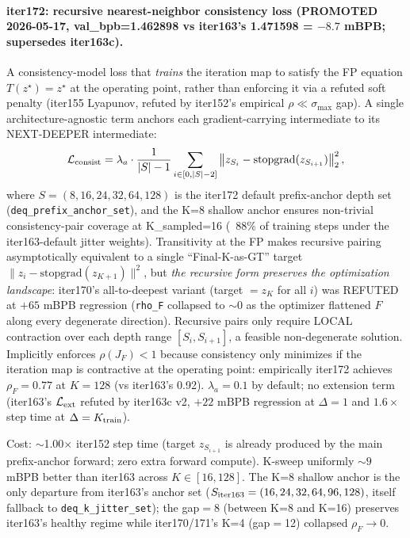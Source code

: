 \documentclass[11pt]{article}
\begin{document}
\paragraph{iter172: recursive nearest-neighbor consistency loss (PROMOTED 2026-05-17, val\_bpb=1.462898 vs iter163's 1.471598 = $-8.7$ mBPB; supersedes iter163c).}
A consistency-model loss \cite{songConsistencyModels2023} that
\emph{trains} the iteration map to satisfy the FP equation
$T(z^\star)=z^\star$ at the operating point, rather than enforcing it via
a refuted soft penalty (iter155 Lyapunov, refuted by iter152's empirical
$\rho \ll \sigma_{\max}$ gap).  A single architecture-agnostic term anchors
each gradient-carrying intermediate to its NEXT-DEEPER intermediate:
\begin{equation}
  \mathcal{L}_{\rm consist}
    = \lambda_a \cdot \frac{1}{|S|-1}
      \sum_{i \in [0, |S|-2]}
       \left\| z_{S_i} - \mathrm{stopgrad}(z_{S_{i+1}}) \right\|_2^2,
\end{equation}
where $S = (8, 16, 24, 32, 64, 128)$ is the iter172 default prefix-anchor
depth set (\texttt{deq\_prefix\_anchor\_set}), and the K=8 shallow anchor
ensures non-trivial consistency-pair coverage at K\_sampled=16 (~88\% of
training steps under the iter163-default jitter weights).  Transitivity at
the FP makes recursive pairing asymptotically equivalent to a single
``Final-K-as-GT'' target $\|z_i - \mathrm{stopgrad}(z_{K+1})\|^2$, but
\emph{the recursive form preserves the optimization landscape}: iter170's
all-to-deepest variant (target $= z_K$ for all $i$) was REFUTED at $+65$
mBPB regression (\texttt{rho\_F} collapsed to $\sim 0$ as the optimizer
flattened $F$ along every degenerate direction).  Recursive pairs only
require LOCAL contraction over each depth range $[S_i, S_{i+1}]$, a
feasible non-degenerate solution.  Implicitly enforces $\rho(J_F) < 1$
because consistency only minimizes if the iteration map is contractive at
the operating point: empirically iter172 achieves $\rho_F = 0.77$ at
$K=128$ (vs iter163's 0.92).
$\lambda_a = 0.1$ by default; no extension term (iter163's
$\mathcal{L}_{\rm ext}$ refuted by iter163c v2, $+22$ mBPB regression at
$\Delta = 1$ and $1.6\times$ step time at $\Delta = K_{\rm train}$).

Cost: $\sim$1.00$\times$ iter152 step time (target $z_{S_{i+1}}$ is
already produced by the main prefix-anchor forward; zero extra forward
compute).  K-sweep uniformly $\sim 9$ mBPB better than iter163 across
$K \in [16, 128]$.  The K=8 shallow anchor is the only departure from
iter163's anchor set ($S_{\rm iter163} = (16, 24, 32, 64, 96, 128)$,
itself fallback to \texttt{deq\_k\_jitter\_set}); the gap$=$8 (between K=8
and K=16) preserves iter163's healthy regime while iter170/171's K=4
(gap$=$12) collapsed $\rho_F \to 0$.
\end{document}
